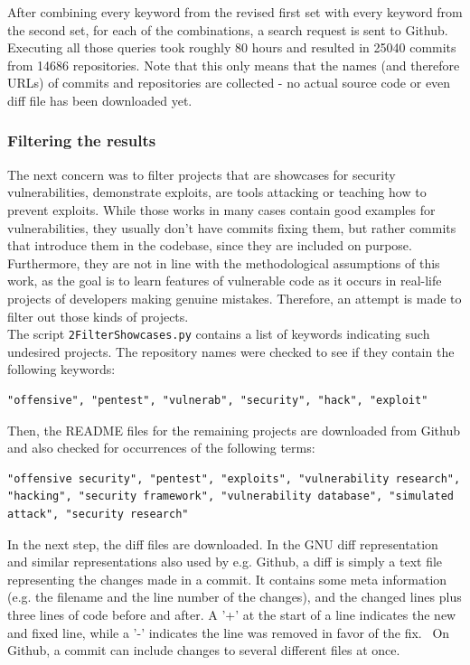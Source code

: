 \documentclass[
	a4paper,
	pagesize,
	pdftex,
	12pt,
	twoside, %
	BCOR=5mm, %
	ngerman,
	fleqn,
	final,
	]{scrartcl}
\begin{document}
After combining every keyword from the revised first set with every keyword from the second set, for each of the combinations, a search request is sent to Github. Executing all those queries took roughly 80 hours and resulted in 25040 commits from 14686 repositories.
Note that this only means that the names (and therefore URLs) of commits and repositories are collected - no actual source code or even diff file has been downloaded yet.

\subsubsection{Filtering the results}

The next concern was to filter projects that are showcases for security vulnerabilities, demonstrate exploits, are tools attacking or teaching how to prevent exploits. While those works in many cases contain good examples for vulnerabilities, they usually don't have commits fixing them, but rather commits that introduce them in the codebase, since they are included on purpose. Furthermore, they are not in line with the methodological assumptions of this work, as the goal is to learn features of vulnerable code as it occurs in real-life projects of developers making genuine mistakes. Therefore, an attempt is made to filter out those kinds of projects.\\
The script \texttt{2FilterShowcases.py} contains a list of keywords indicating such undesired projects. The repository names were checked to see if they contain the following keywords:
\begin{lstlisting}
"offensive", "pentest", "vulnerab", "security", "hack", "exploit"
\end{lstlisting}
Then, the README files for the remaining projects are downloaded from Github and also checked for occurrences of the following terms:
\begin{lstlisting}
"offensive security", "pentest", "exploits", "vulnerability research", "hacking", "security framework", "vulnerability database", "simulated attack", "security research"
\end{lstlisting}
In the next step, the diff files are downloaded. In the GNU diff representation and similar representations also used by e.g. Github, a diff is simply a text file representing the changes made in a commit. It contains some meta information (e.g. the filename and the line number of the changes), and the changed lines plus three lines of code before and after. A '+' at the start of a line indicates the new and fixed line, while a '-' indicates the line was removed in favor of the fix.~\cite{Liu.2018} On Github, a commit can include changes to several different files at once.\\
\end{document}
